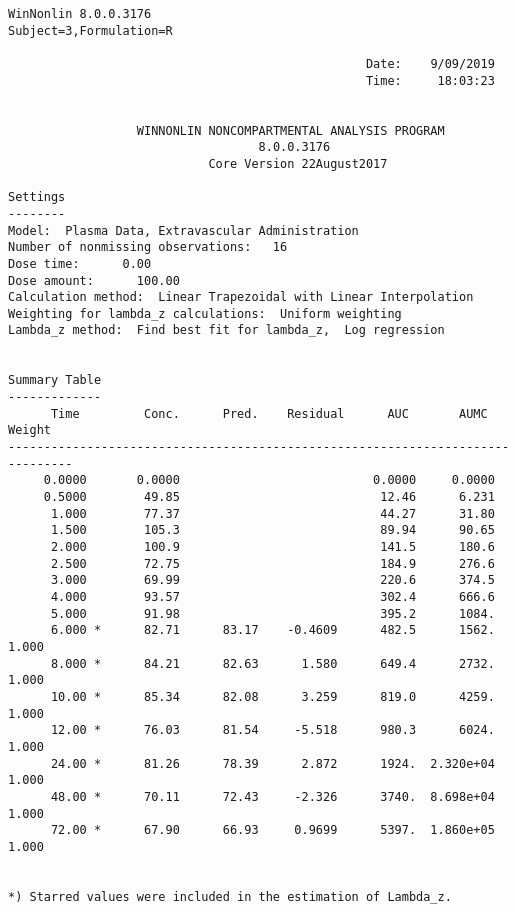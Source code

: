 \documentclass[12pt,a4paper]{article}
\begin{document}
\begin{verbatim}
WinNonlin 8.0.0.3176
Subject=3,Formulation=R

                                                  Date:    9/09/2019
                                                  Time:     18:03:23


                  WINNONLIN NONCOMPARTMENTAL ANALYSIS PROGRAM
                                   8.0.0.3176
                            Core Version 22August2017

Settings
--------
Model:  Plasma Data, Extravascular Administration
Number of nonmissing observations:   16
Dose time:      0.00
Dose amount:      100.00
Calculation method:  Linear Trapezoidal with Linear Interpolation
Weighting for lambda_z calculations:  Uniform weighting
Lambda_z method:  Find best fit for lambda_z,  Log regression


Summary Table
-------------
      Time         Conc.      Pred.    Residual      AUC       AUMC      Weight
-------------------------------------------------------------------------------
     0.0000       0.0000                           0.0000     0.0000
     0.5000        49.85                            12.46      6.231
      1.000        77.37                            44.27      31.80
      1.500        105.3                            89.94      90.65
      2.000        100.9                            141.5      180.6
      2.500        72.75                            184.9      276.6
      3.000        69.99                            220.6      374.5
      4.000        93.57                            302.4      666.6
      5.000        91.98                            395.2      1084.
      6.000 *      82.71      83.17    -0.4609      482.5      1562.      1.000
      8.000 *      84.21      82.63      1.580      649.4      2732.      1.000
      10.00 *      85.34      82.08      3.259      819.0      4259.      1.000
      12.00 *      76.03      81.54     -5.518      980.3      6024.      1.000
      24.00 *      81.26      78.39      2.872      1924.  2.320e+04      1.000
      48.00 *      70.11      72.43     -2.326      3740.  8.698e+04      1.000
      72.00 *      67.90      66.93     0.9699      5397.  1.860e+05      1.000


*) Starred values were included in the estimation of Lambda_z.



\end{verbatim}
\end{document}
